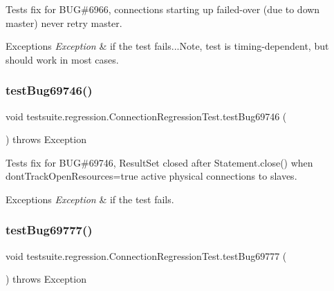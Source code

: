 Tests fix for B\+UG\#6966, connections starting up failed-\/over (due to down master) never retry master.


\begin{DoxyExceptions}{Exceptions}
{\em Exception} & if the test fails...Note, test is timing-\/dependent, but should work in most cases. \\
\hline
\end{DoxyExceptions}
\mbox{\label{classtestsuite_1_1regression_1_1_connection_regression_test_adeeac09d039c69e054e676529af26ca7}} 
\subsubsection{\texorpdfstring{test\+Bug69746()}{testBug69746()}}
{\footnotesize\ttfamily void testsuite.\+regression.\+Connection\+Regression\+Test.\+test\+Bug69746 (\begin{DoxyParamCaption}{ }\end{DoxyParamCaption}) throws Exception}

Tests fix for B\+UG\#69746, Result\+Set closed after Statement.\+close() when dont\+Track\+Open\+Resources=true active physical connections to slaves.


\begin{DoxyExceptions}{Exceptions}
{\em Exception} & if the test fails. \\
\hline
\end{DoxyExceptions}
\mbox{\label{classtestsuite_1_1regression_1_1_connection_regression_test_a6d62956aba90350317ed7d34d3d6eb39}} 
\subsubsection{\texorpdfstring{test\+Bug69777()}{testBug69777()}}
{\footnotesize\ttfamily void testsuite.\+regression.\+Connection\+Regression\+Test.\+test\+Bug69777 (\begin{DoxyParamCaption}{ }\end{DoxyParamCaption}) throws Exception}

